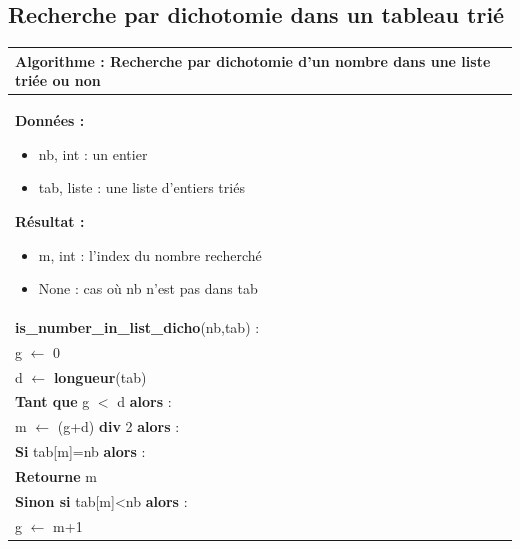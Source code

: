 \documentclass[10pt]{article}
\begin{document}
\subsection{Recherche par dichotomie dans un tableau trié}


\begin{minipage}[c]{.48\linewidth}
\begin{pseudo}
\begin{center}
\begin{tabular}{p{}}
\hline
\textbf{Algorithme :} Recherche par dichotomie d'un nombre dans une liste triée ou non \\
\hline
\textbf{Données :}
\begin{itemize}
\item \textsf{nb}, int : un entier 
\item \textsf{tab}, liste : une liste d'entiers triés
\end{itemize}
\textbf{Résultat :} 
\begin{itemize}
\item \textsf{m}, int : l'index du nombre recherché
\item \textsf{None} : cas où \textsf{nb} n'est pas dans \textsf{tab}
\end{itemize}
\\
\textbf{is\_number\_in\_list\_dicho}(\textsf{nb},\textsf{tab}) :\\
\hspace{.4cm}\textsf{g} $\leftarrow$ \textsf{0} \\
\hspace{.4cm}\textsf{d} $\leftarrow$ \textbf{longueur}(\textsf{tab}) \\
\hspace{.4cm}\textbf{Tant que} \textsf{g $<$ d} \textbf{alors} : \\
\hspace{.8cm} \textsf{m} $\leftarrow$ \textsf{(g+d)} \textbf{div} \textsf{2} \textbf{alors} :\\
\hspace{1.2cm}\textbf{Si} \textsf{tab[m]=nb} \textbf{alors} :\\
\hspace{1.6cm}\textbf{Retourne} \textsf{m}\\
\hspace{1.2cm}\textbf{Sinon si} \textsf{tab[m]<nb} \textbf{alors} :\\
\hspace{1.6cm}\textsf{g} $\leftarrow$ \textsf{m+1}\\

\end{tabular}
\end{center}
\end{pseudo}
\end{minipage}
\end{document}
